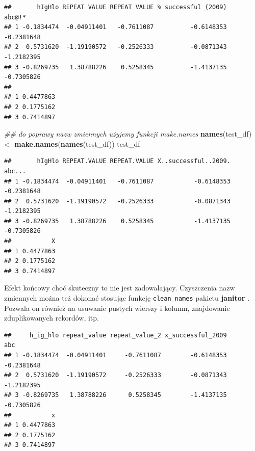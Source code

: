 \documentclass[]{book}
\newenvironment{Shaded}{\begin{snugshade}}{\end{snugshade}}
\newcommand{\CommentTok}[1]{\textcolor[rgb]{0.56,0.35,0.01}{\textit{#1}}}
\newcommand{\KeywordTok}[1]{\textcolor[rgb]{0.13,0.29,0.53}{\textbf{#1}}}
\newcommand{\NormalTok}[1]{#1}
\newcommand{\OperatorTok}[1]{\textcolor[rgb]{0.81,0.36,0.00}{\textbf{#1}}}
\newcommand{\StringTok}[1]{\textcolor[rgb]{0.31,0.60,0.02}{#1}}
\theoremstyle{plain}
\theoremstyle{definition}
\begin{document}
\begin{verbatim}
##       hIgHlo REPEAT VALUE REPEAT VALUE % successful (2009)     abc@!*
## 1 -0.1834474  -0.04911401   -0.7611087          -0.6148353 -0.2381648
## 2  0.5731620  -1.19190572   -0.2526333          -0.0871343 -1.2182395
## 3 -0.8269735   1.38788226    0.5258345          -1.4137135 -0.7305826
##            
## 1 0.4477863
## 2 0.1775162
## 3 0.7414897
\end{verbatim}

\begin{Shaded}
\begin{Highlighting}[]
\CommentTok{## do poprawy nazw zmiennych użyjemy funkcji make.names}
\KeywordTok{names}\NormalTok{(test_df) <-}\StringTok{ }\KeywordTok{make.names}\NormalTok{(}\KeywordTok{names}\NormalTok{(test_df))}
\NormalTok{test_df}
\end{Highlighting}
\end{Shaded}

\begin{verbatim}
##       hIgHlo REPEAT.VALUE REPEAT.VALUE X..successful..2009.     abc...
## 1 -0.1834474  -0.04911401   -0.7611087           -0.6148353 -0.2381648
## 2  0.5731620  -1.19190572   -0.2526333           -0.0871343 -1.2182395
## 3 -0.8269735   1.38788226    0.5258345           -1.4137135 -0.7305826
##           X
## 1 0.4477863
## 2 0.1775162
## 3 0.7414897
\end{verbatim}

Efekt końcowy choć skuteczny to nie jest zadowalający. Czyszczenia nazw zmiennych można też dokonać stosując funkcję \texttt{clean\_names} pakietu \textbf{janitor} \citep{R-janitor}. Pozwala on również na usuwanie pustych wierszy i kolumn, znajdowanie zduplikowanych rekordów, itp.

\begin{Shaded}
\end{Shaded}

\begin{verbatim}
##     h_ig_hlo repeat_value repeat_value_2 x_successful_2009        abc
## 1 -0.1834474  -0.04911401     -0.7611087        -0.6148353 -0.2381648
## 2  0.5731620  -1.19190572     -0.2526333        -0.0871343 -1.2182395
## 3 -0.8269735   1.38788226      0.5258345        -1.4137135 -0.7305826
##           x
## 1 0.4477863
## 2 0.1775162
## 3 0.7414897
\end{verbatim}
\end{document}
